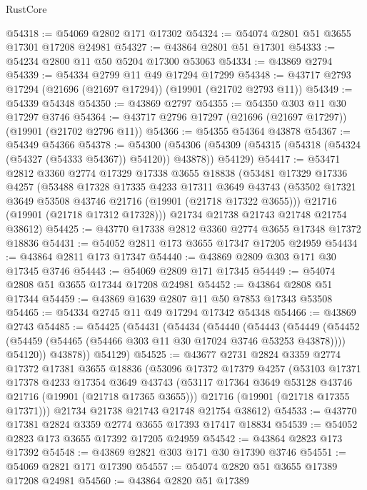 \begin{lexlean}{RustCore}
\begin{coremodule}
@54318 := @54069 @2802 @171 @17302
@54324 := @54074 @2801 @51 @3655 @17301 @17208 @24981
@54327 := @43864 @2801 @51 @17301
@54333 := @54234 @2800 @11 @50 @5204 @17300 @53063
@54334 := @43869 @2794
@54339 := @54334 @2799 @11 @49 @17294 @17299
@54348 := @43717 @2793 @17294 (@21696 (@21697 @17294)) (@19901 (@21702 @2793 @11))
@54349 := @54339 @54348
@54350 := @43869 @2797
@54355 := @54350 @303 @11 @30 @17297 @3746
@54364 := @43717 @2796 @17297 (@21696 (@21697 @17297)) (@19901 (@21702 @2796 @11))
@54366 := @54355 @54364 @43878
@54367 := @54349 @54366
@54378 := @54300
    (@54306 (@54309 (@54315 (@54318 (@54324 (@54327 (@54333 @54367)) @54120)) @43878)) @54129)
@54417 := @53471
    @2812
    @3360
    @2774
    @17329
    @17338
    @3655
    @18838
    (@53481
      @17329
      @17336
      @4257
      (@53488
        @17328
        @17335
        @4233
        @17311
        @3649
        @43743
        (@53502 @17321 @3649 @53508 @43746 @21716 (@19901 (@21718 @17322 @3655)))
        @21716
        (@19901 (@21718 @17312 @17328)))
      @21734
      @21738
      @21743
      @21748
      @21754
      @38612)
@54425 := @43770 @17338 @2812 @3360 @2774 @3655 @17348 @17372 @18836
@54431 := @54052 @2811 @173 @3655 @17347 @17205 @24959
@54434 := @43864 @2811 @173 @17347
@54440 := @43869 @2809 @303 @171 @30 @17345 @3746
@54443 := @54069 @2809 @171 @17345
@54449 := @54074 @2808 @51 @3655 @17344 @17208 @24981
@54452 := @43864 @2808 @51 @17344
@54459 := @43869 @1639 @2807 @11 @50 @7853 @17343 @53508
@54465 := @54334 @2745 @11 @49 @17294 @17342 @54348
@54466 := @43869 @2743
@54485 := @54425
    (@54431
      (@54434
        (@54440
          (@54443
            (@54449
              (@54452 (@54459 (@54465 (@54466 @303 @11 @30 @17024 @3746 @53253 @43878))))
              @54120))
          @43878))
      @54129)
@54525 := @43677
    @2731
    @2824
    @3359
    @2774
    @17372
    @17381
    @3655
    @18836
    (@53096
      @17372
      @17379
      @4257
      (@53103
        @17371
        @17378
        @4233
        @17354
        @3649
        @43743
        (@53117 @17364 @3649 @53128 @43746 @21716 (@19901 (@21718 @17365 @3655)))
        @21716
        (@19901 (@21718 @17355 @17371)))
      @21734
      @21738
      @21743
      @21748
      @21754
      @38612)
@54533 := @43770 @17381 @2824 @3359 @2774 @3655 @17393 @17417 @18834
@54539 := @54052 @2823 @173 @3655 @17392 @17205 @24959
@54542 := @43864 @2823 @173 @17392
@54548 := @43869 @2821 @303 @171 @30 @17390 @3746
@54551 := @54069 @2821 @171 @17390
@54557 := @54074 @2820 @51 @3655 @17389 @17208 @24981
@54560 := @43864 @2820 @51 @17389

\end{coremodule}
\end{lexlean}
